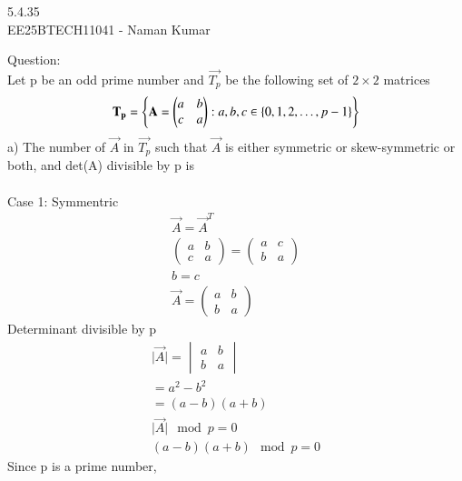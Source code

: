 \documentclass[journal]{IEEEtran}
\author{EE25BTECH11041-Naman Kumar }
\begin{document}
\begin{center}
    \huge{5.4.35}\\
    \large{EE25BTECH11041 - Naman Kumar}
\end{center}
Question:\\
Let p be an odd prime number and $\vec{T_p}$ be the following set of $2\times2$ matrices
\begin{align}
\vec{T_p}=\cbrak{\Vec{A}=\begin{pmatrix}a&b\\c&a\end{pmatrix}:a,b,c \in \cbrak{0,1,2,\dots,p-1} }
\end{align}
a) The number of $\vec{A}$ in $\vec{T_p}$ such that $\vec{A}$ is either symmetric or skew-symmetric or
both, and det(A) divisible by p is\\
\solution \\
Case 1: Symmentric
\begin{align}
    \vec{A}=\vec{A}^T\\
    \begin{pmatrix}a&b\\c&a\end{pmatrix}=\begin{pmatrix}a&c\\b&a\end{pmatrix}\\
    b=c\\
    \vec{A}=\begin{pmatrix}a&b\\b&a\end{pmatrix}
\end{align}
Determinant divisible by p
\begin{align}
    \vert\vec{A}\vert=\begin{vmatrix}a&b\\b&a\end{vmatrix}\\
    =a^2-b^2\\
    =(a-b)(a+b)\\
    \vert \vec{A}\vert\mod p =0\\
    (a-b)(a+b) \mod p=0
\end{align}
Since p is a prime number, \\
\end{document}
